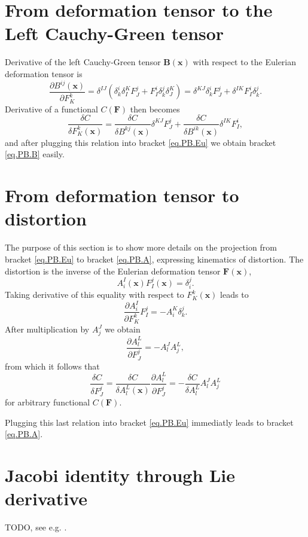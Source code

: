 \documentclass[
10pt, %
a4paper, %
oneside, %
headinclude,footinclude, %
BCOR5mm, %
]{scrartcl}
\newcommand{\xx}{\mathbf{x}}
\newcommand{\FF}{\mathbf{F}}
\newcommand{\BB}{\mathbf{B}}
\begin{document}
\section{From deformation tensor to the Left Cauchy-Green tensor}\label{sec.F-B}
Derivative of the left Cauchy-Green tensor $\BB(\xx)$ with respect to the Eulerian deformation tensor is
\begin{equation}
	\frac{\partial B^{ij}(\xx)}{\partial F^k_K} = \delta^{IJ}(\delta^i_k \delta^K_I F^j_J +  F^i_I \delta^j_k \delta^K_J)
	= \delta^{KJ}\delta^i_k F^j_J +  \delta^{IK} F^i_I \delta^j_k.
\end{equation}
Derivative of a functional $C(\FF)$ then becomes
\begin{equation}
	\frac{\delta C}{\delta F^k_K(\xx)} = 
	\frac{\delta C}{\delta B^{kj}(\xx)}\delta^{KJ} F^j_J +  \frac{\delta C}{\delta B^{ik}(\xx)}\delta^{IK} F^i_I,
\end{equation}
and after plugging this relation into bracket \eqref{eq.PB.Eu} we obtain bracket \eqref{eq.PB.B} easily.


\section{From deformation tensor to distortion}\label{sec.F-A}
The purpose of this section is to show more details on the projection from bracket \eqref{eq.PB.Eu} to bracket \eqref{eq.PB.A}, expressing kinematics of distortion. The distortion is the inverse of the Eulerian deformation tensor $\FF(\xx)$, 
\begin{equation}
	A^I_i(\xx) F^j_I(\xx) = \delta^j_i.
\end{equation}
Taking derivative of this equality with respect to $F^k_K(\xx)$ leads to
\begin{equation}
	\frac{\partial A^I_i}{\partial F^k_K} F^j_I = -A^K_i \delta^j_k.
\end{equation}
After multiplication by $A^J_j$ we obtain
\begin{equation}\label{app.eq.dAdF}
	\frac{\partial A^L_l}{\partial F^j_J} = -A^J_l A^L_j,
\end{equation}
from which it follows that 
\begin{equation}
	\frac{\delta C}{\delta F^j_J} = \frac{\delta C}{\delta A^L_l(\xx)} \frac{\partial A^L_l}{\partial F^j_J} = -\frac{\delta C}{\delta A^L_l} A^J_l A^L_j
\end{equation}
for arbitrary functional $C(\FF)$.

Plugging this last relation into bracket \eqref{eq.PB.Eu} immediatly leads to bracket \eqref{eq.PB.A}.

\section{Jacobi identity through Lie derivative}\label{sec.Jacobi.L}
TODO, see e.g. \cite{Fecko}.
\end{document}
